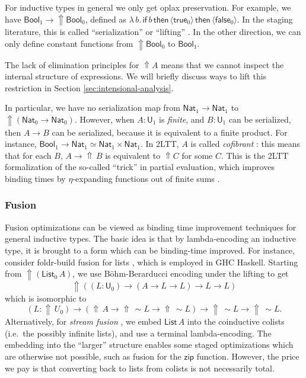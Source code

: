 \documentclass[acmsmall]{acmart}
\newcommand{\msf}[1]{\mathsf{#1}}
\newcommand{\Lift}{{\Uparrow}}
\newcommand{\spl}{{\sim}}
\newcommand{\qut}[1]{\langle #1\rangle}
\renewcommand{\U}{\msf{U}}
\newcommand{\Bool}{\msf{Bool}}
\newcommand{\true}{\msf{true}}
\newcommand{\false}{\msf{false}}
\newcommand{\List}{\msf{List}}
\newcommand{\Nat}{\msf{Nat}}
\theoremstyle{remark}
\begin{document}
For inductive types in general we only get oplax preservation. For example, we
have $\Bool_1 \to \Lift \Bool_0$, defined as
$\lambda\,b.\,\msf{if}\,b\,\msf{then}\,\qut{\true_0}\,\msf{then}\,\qut{\false_0}$.
In the staging literature, this is called ``serialization'' or ``lifting''
\cite{template-haskell,metaml}.  In the other direction, we can only define
constant functions from $\Lift \Bool_0$ to $\Bool_1$.

The lack of elimination principles for $\Lift A$ means that we cannot inspect
the internal structure of expressions. We will briefly discuss ways to lift this
restriction in Section \ref{sec:intensional-analysis}.

In particular, we have no serialization map from $\Nat_1 \to \Nat_1$ to
$\Lift(\Nat_0 \to \Nat_0)$. However, when $A : \U_1$ is \emph{finite}, and $B :
\U_1$ can be serialized, then $A \to B$ can be serialized, because it is
equivalent to a finite product. For instance, $\Bool_1 \to \Nat_1 \simeq \Nat_1
\times \Nat_1$.  In 2LTT, $A$ is called \emph{cofibrant}
\cite[Section~3.4]{twolevel}: this means that for each $B$, $A \to \Lift\,B$ is
equivalent to $\Lift C$ for some $C$. This is the 2LTT formalization of the
so-called ``trick'' in partial evaluation, which improves binding times by
$\eta$-expanding functions out of finite sums \cite{eta-expansion-trick}.

\subsubsection{Fusion}
Fusion optimizations can be viewed as binding time improvement techniques for
general inductive types. The basic idea is that by lambda-encoding an inductive
type, it is brought to a form which can be binding-time improved. For instance,
consider foldr-build fusion for lists \cite{short-cut}, which is employed in GHC
Haskell.  Starting from $\Lift (\List_0\,A)$, we use Böhm-Berarducci encoding
\cite{boehm-berarducci} under the lifting to get
\[ \Lift((L : \U_0) \to (A \to L \to L) \to L \to L) \]
which is isomorphic to
\[ (L : \Lift\,U_0) \to (\Lift\,A \to \Lift\,\spl L \to \Lift\,\spl L)
    \to \Lift\,\spl L \to \Lift\,\spl L. \]
Alternatively, for \emph{stream fusion} \cite{stream-fusion}, we embed $\List\,A$ into the
coinductive colists (i.e.\ the possibly infinite lists), and use a terminal
lambda-encoding. The embedding into the ``larger'' structure enables some staged
optimizations which are otherwise not possible, such as fusion for the
$\msf{zip}$ function. However, the price we pay is that converting
back to lists from colists is not necessarily total.
\end{document}
